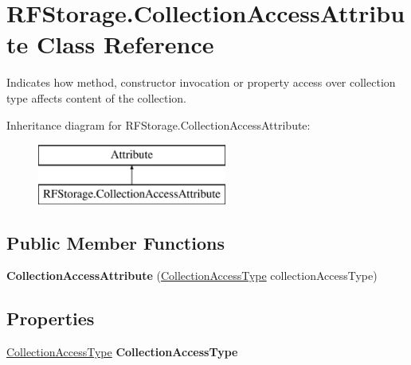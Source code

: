 \hypertarget{class_r_f_storage_1_1_collection_access_attribute}{}\section{R\+F\+Storage.\+Collection\+Access\+Attribute Class Reference}
\label{class_r_f_storage_1_1_collection_access_attribute}


Indicates how method, constructor invocation or property access over collection type affects content of the collection.  


Inheritance diagram for R\+F\+Storage.\+Collection\+Access\+Attribute\+:\begin{figure}[H]
\begin{center}
\leavevmode
\includegraphics[height=2.000000cm]{class_r_f_storage_1_1_collection_access_attribute}
\end{center}
\end{figure}
\subsection*{Public Member Functions}
\begin{DoxyCompactItemize}
\item 
\mbox{\label{class_r_f_storage_1_1_collection_access_attribute_a6cbba8fe669928244a15f3ea856184d5}} 
{\bfseries Collection\+Access\+Attribute} (\mbox{\hyperlink{namespace_r_f_storage_a0db1dea9793c2bb602b4a93dad0de1c6}{Collection\+Access\+Type}} collection\+Access\+Type)
\end{DoxyCompactItemize}
\subsection*{Properties}
\begin{DoxyCompactItemize}
\item 
\mbox{\label{class_r_f_storage_1_1_collection_access_attribute_abfa3691fb506d1866b0b5d07260ac74e}} 
\mbox{\hyperlink{namespace_r_f_storage_a0db1dea9793c2bb602b4a93dad0de1c6}{Collection\+Access\+Type}} {\bfseries Collection\+Access\+Type}
\end{DoxyCompactItemize}


